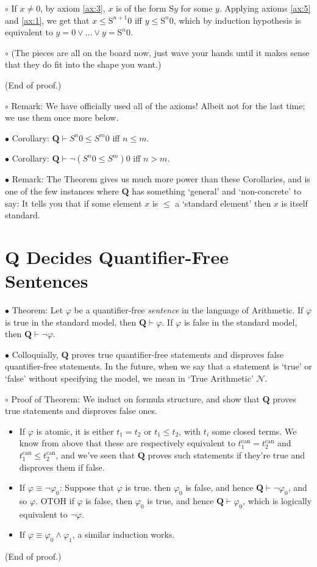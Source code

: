 \documentclass{article}
\newcommand{\RQ}{\mathbf{Q}}
\newcommand{\TN}{\mathcal{N}}
\newcommand{\suc}{\mathrm{S}}
\newcommand{\can}{\mathrm{can}}
\newcommand\Point[1]{\noindent \hspace{\labelsep} {
$\bullet$ #1} \smallskip}
\newcommand\point[1]{\noindent \hspace{\labelsep} {\small $\circ$ #1} \smallskip}
\newcommand\timestamp[1]{}
\newcommand\proofend{\hfill(End of proof.)}
\begin{document}
\point{If $x \neq 0$, by axiom \ref{ax:3}, $x$ is of the form $\suc y$ for some $y$. Applying axioms \ref{ax:5} and \ref{ax:1}, we get that $x \leq \suc^{n+1}0$ iff $y \leq \suc^n 0$, which by induction hypothesis is equivalent to $y = 0 \lor \dots \lor y = \suc^n 0$.}

\point{(The pieces are all on the board now, just wave your hands until it makes sense that they do fit into the shape you want.)

\proofend}

\point{Remark: We have officially used all of the axioms! Albeit not for the last time; we use them once more below.}

\Point{Corollary: $\RQ \vdash S^n 0 \leq S^m 0$ iff $n \leq m$.}

\Point{Corollary: $\RQ \vdash \neg(S^n 0 \leq S^m) 0$ iff $n > m$.}

\Point{Remark: The Theorem gives us much more power than these Corollaries, and is one of the few instances where $\RQ$ has something `general' and `non-concrete' to say: It tells you that if some element $x$ is $\leq$ a `standard element' then $x$ is itself standard.}

\timestamp{35 min}

\section{$\RQ$ Decides Quantifier-Free Sentences}

\Point{Theorem: Let $\varphi$ be a quantifier-free \emph{sentence} in the language of Arithmetic. If $\varphi$ is true in the standard model, then $\RQ \vdash \varphi$. If $\varphi$ is false in the standard model, then $\RQ \vdash \neg\varphi$.}

\Point{Colloquially, $\RQ$ proves true quantifier-free statements and disproves false quantifier-free statements. In the future, when we say that a statement is `true' or `false' without specifying the model, we mean in `True Arithmetic' $\TN$.}

\point{Proof of Theorem: We induct on formula structure, and show that $\RQ$ proves true statements and disproves false ones.
\begin{itemize}
\item If $\varphi$ is atomic, it is either $t_1 = t_2$ or $t_1 \leq t_2$, with $t_i$ some closed terms. We know from above that these are respectively equivalent to $t_1^\can = t_2^\can$ and $t_1^\can \leq t_2^\can$, and we've seen that $\RQ$ proves such statements if they're true and disproves them if false.

\item If $\varphi \equiv \neg \varphi_0$: Suppose that $\varphi$ is true. then $\varphi_0$ is false, and hence $\RQ \vdash \neg \varphi_0$, and so $\varphi$. OTOH if $\varphi$ is false, then $\varphi_0$ is true, and hence $\RQ \vdash \varphi_0$, which is logically equivalent to $\neg \varphi$.

\item If $\varphi \equiv \varphi_0 \land \varphi_1$, a similar induction works.
\end{itemize}
\proofend}
\end{document}
